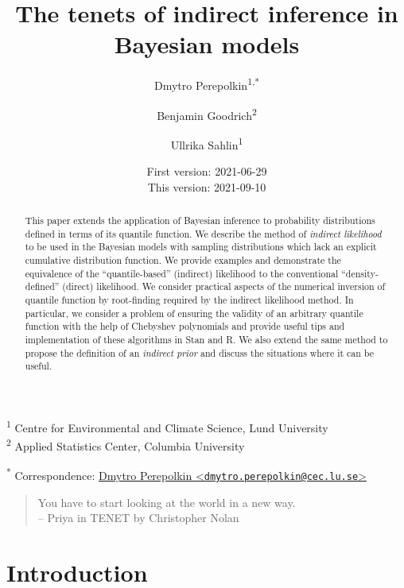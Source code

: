 \documentclass[
  12pt,
]{article}
\title{\vspace{1cm}The tenets of indirect inference in Bayesian models\vspace{0.5cm}}
\author{Dmytro Perepolkin\textsuperscript{1,*} \and Benjamin Goodrich\textsuperscript{2} \and Ullrika Sahlin\textsuperscript{1}}
\date{First version: 2021-06-29\\
This version: 2021-09-10}
\begin{document}
\maketitle
\begin{abstract}
\noindent{}
This paper extends the application of Bayesian inference to probability distributions defined in terms of its quantile function. We describe the method of \emph{indirect likelihood} to be used in the Bayesian models with sampling distributions which lack an explicit cumulative distribution function. We provide examples and demonstrate the equivalence of the ``quantile-based'' (indirect) likelihood to the conventional ``density-defined'' (direct) likelihood. We consider practical aspects of the numerical inversion of quantile function by root-finding required by the indirect likelihood method. In particular, we consider a problem of ensuring the validity of an arbitrary quantile function with the help of Chebyshev polynomials and provide useful tips and implementation of these algorithms in Stan and R. We also extend the same method to propose the definition of an \emph{indirect prior} and discuss the situations where it can be useful. \vspace{.8cm}
\end{abstract}

\textsuperscript{1} Centre for Environmental and Climate Science, Lund University\\
\textsuperscript{2} Applied Statistics Center, Columbia University

\textsuperscript{*} Correspondence: \href{mailto:dmytro.perepolkin@cec.lu.se}{Dmytro Perepolkin \textless{}\href{mailto:dmytro.perepolkin@cec.lu.se}{\nolinkurl{dmytro.perepolkin@cec.lu.se}}\textgreater{}}

\setcounter{tocdepth}{4}
\tableofcontents
\renewcommand{\[}{\begin{equation}}
\renewcommand{\]}{\end{equation}}

\begin {quotation}
You have to start looking at the world in a new way.\\ 
-- Priya in TENET by Christopher Nolan 
\end{quotation}

\hypertarget{introduction}{%
\section{Introduction}\label{introduction}}
\end{document}
